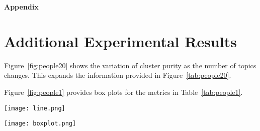 \documentclass[11pt]{article}
\begin{document}
\nocite{langley00}





\newpage
\appendix
\onecolumn
\textbf{\Large Appendix} \vspace*{1em} \\

\section{Additional Experimental Results}
Figure~\ref{fig:people20} shows the variation of cluster purity as the number of topics changes. This expands the information provided in Figure~\ref{tab:people20}.

Figure~\ref{fig:people1} provides box plots for the metrics in Table~\ref{tab:people1}.

\begin{figure*}
\texttt{[image: line.png]}
\centering
\caption{Each column represents a metric and each row represents a dataset. The error bar represents the standard deviation that is created by running the same model for 10 times with different random seeds.}
\label{fig:people20}
\end{figure*}

\begin{figure*}
\texttt{[image: boxplot.png]}
\caption{Each row represents a metric and each column represent a dataset. The boxplot is created by running the same model for 10 times with different random seeds. Mean and variance values are presented in the boxplot. vONT is the left most. We mark its performance in skyblue. }
\label{fig:people1}
\end{figure*}
\end{document}
